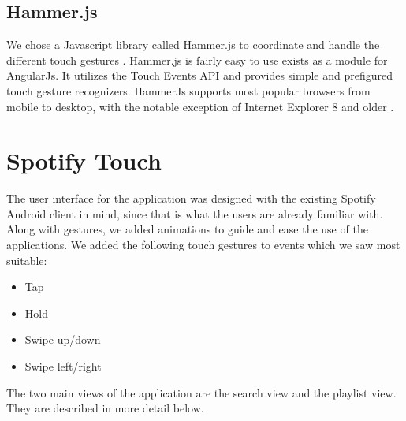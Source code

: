 \documentclass[conference]{IEEEtran}
\begin{document}
\subsection{Hammer.js}

We chose a Javascript library called Hammer.js to coordinate and handle the different touch gestures \cite{HammerJS}. Hammer.js is fairly easy to use exists as a module for AngularJs. It utilizes the Touch Events API and provides simple and prefigured touch gesture recognizers. HammerJs supports most popular browsers from mobile to desktop, with the notable exception of Internet Explorer 8 and older \cite{HammerJSBrowserSupport}.





\section{Spotify Touch}

The user interface for the application was designed with the existing Spotify Android client in mind,
since that is what the users are already familiar with. Along with gestures, we added animations to guide and ease the use of the applications. We added the following touch gestures to events which we saw most suitable:

\begin{itemize}
\item Tap
\item Hold
\item Swipe up/down
\item Swipe left/right
\end{itemize}

The two main views of the application are the search view and the playlist view. They are described in more detail below.
\end{document}
